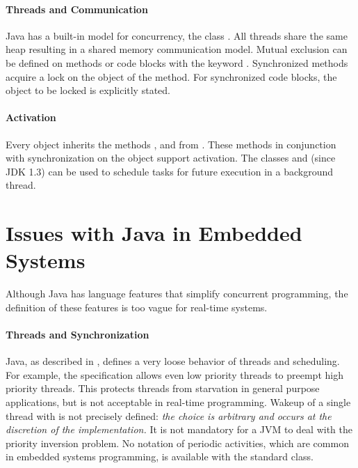 \paragraph{Threads and Communication}

Java has a built-in model for concurrency, the class .
All threads share the same heap resulting in a shared memory
communication model. Mutual exclusion can be defined on methods or
code blocks with the keyword . Synchronized
methods acquire a lock on the object of the method. For synchronized
code blocks, the object to be locked is explicitly stated.


\paragraph{Activation}

Every object inherits the methods ,  and
 from . These methods in conjunction
with synchronization on the object support activation. The classes
 and  (since JDK
1.3) can be used to schedule tasks for future execution in a
background thread.

\section{Issues with Java in Embedded Systems}

Although Java has language features that simplify concurrent
programming, the definition of these features is too vague for
real-time systems.


\paragraph{Threads and Synchronization}

Java, as described in \cite{JavaLangSpec2}, defines a very loose
behavior of threads and scheduling. For example, the specification
allows even low priority threads to preempt high priority threads.
This protects threads from starvation in general purpose
applications, but is not acceptable in real-time programming. Wakeup
of a single thread with  is not precisely defined:
\textit{the choice is arbitrary and occurs at the discretion of the
implementation.} It is not mandatory for a JVM to deal with the
priority inversion problem. No notation of periodic activities,
which are common in embedded systems programming, is available with
the standard  class.

